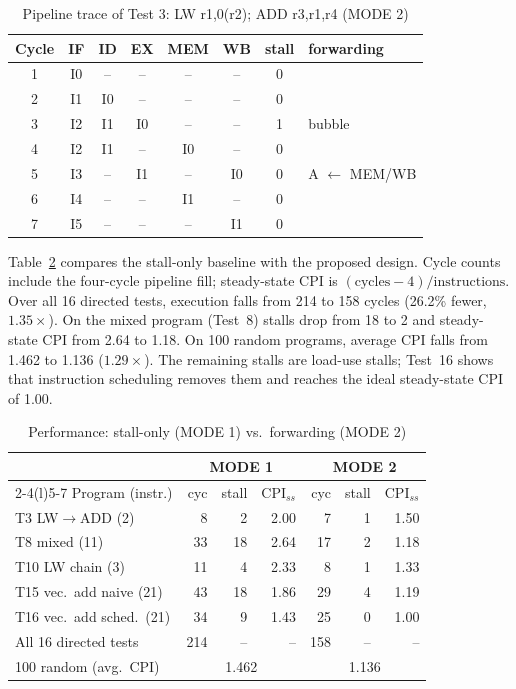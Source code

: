 \documentclass[conference]{IEEEtran}
\begin{document}
\begin{table}[t]
\caption{Pipeline trace of Test 3: LW r1,0(r2); ADD r3,r1,r4 (MODE 2)}
\label{tab:trace}
\centering
\setlength{\tabcolsep}{4pt}
\begin{tabular}{@{}cccccccl@{}}
\toprule
Cycle & IF & ID & EX & MEM & WB & stall & forwarding \\
\midrule
1 & I0 & -- & -- & -- & -- & 0 & \\
2 & I1 & I0 & -- & -- & -- & 0 & \\
3 & I2 & I1 & I0 & -- & -- & 1 & bubble \\
4 & I2 & I1 & -- & I0 & -- & 0 & \\
5 & I3 & -- & I1 & -- & I0 & 0 & A $\leftarrow$ MEM/WB \\
6 & I4 & -- & -- & I1 & -- & 0 & \\
7 & I5 & -- & -- & -- & I1 & 0 & \\
\bottomrule
\end{tabular}
\end{table}

Table~\ref{tab:cpi} compares the stall-only baseline with the proposed design. Cycle counts include the four-cycle pipeline fill; steady-state CPI is $(\text{cycles}-4)/\text{instructions}$. Over all 16 directed tests, execution falls from 214 to 158 cycles (26.2\% fewer, $1.35\times$). On the mixed program (Test~8) stalls drop from 18 to 2 and steady-state CPI from 2.64 to 1.18. On 100 random programs, average CPI falls from 1.462 to 1.136 ($1.29\times$). The remaining stalls are load-use stalls; Test~16 shows that instruction scheduling removes them and reaches the ideal steady-state CPI of 1.00.

\begin{table}[t]
\caption{Performance: stall-only (MODE 1) vs.\ forwarding (MODE 2)}
\label{tab:cpi}
\centering
\setlength{\tabcolsep}{3.5pt}
\begin{tabular}{@{}lrrrrrr@{}}
\toprule
 & \multicolumn{3}{c}{MODE 1} & \multicolumn{3}{c}{MODE 2} \\
\cmidrule(lr){2-4}\cmidrule(l){5-7}
Program (instr.) & cyc & stall & CPI$_{ss}$ & cyc & stall & CPI$_{ss}$ \\
\midrule
T3 LW$\rightarrow$ADD (2) & 8 & 2 & 2.00 & 7 & 1 & 1.50 \\
T8 mixed (11) & 33 & 18 & 2.64 & 17 & 2 & 1.18 \\
T10 LW chain (3) & 11 & 4 & 2.33 & 8 & 1 & 1.33 \\
T15 vec.\ add naive (21) & 43 & 18 & 1.86 & 29 & 4 & 1.19 \\
T16 vec.\ add sched.\ (21) & 34 & 9 & 1.43 & 25 & 0 & 1.00 \\
\midrule
All 16 directed tests & 214 & -- & -- & 158 & -- & -- \\
100 random (avg.\ CPI) & \multicolumn{3}{c}{1.462} & \multicolumn{3}{c}{1.136} \\
\bottomrule
\end{tabular}
\end{table}
\end{document}
